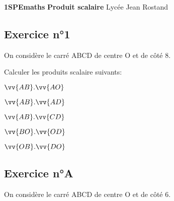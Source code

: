 \documentclass[12pt,a4paper]{article}
\begin{document}
\textbf{1SPEmaths} \hfill \textbf{Produit scalaire} \hfill Lycée Jean Rostand\\
\trait 

\subsection*{Exercice n°1}

On considère le carré ABCD de centre O et de côté 8.

\begin{center}
  
\end{center}
Calculer les produits scalaire suivants:
\begin{enumerate}
\begin{minipage}[t]{0.4\linewidth}
\item $\vv{AB}.\vv{AO}$
\item $\vv{AB}.\vv{AD}$
\end{minipage}
\begin{minipage}[t]{0.4\linewidth}
\item $\vv{AB}.\vv{CD}$
\item $\vv{BO}.\vv{OD}$
\end{minipage}
\begin{minipage}[t]{0.4\linewidth}
\item $\vv{OB}.\vv{DO}$
\end{minipage}

\end{enumerate}

\subsection*{Exercice n°A}


On considère le carré ABCD de centre O et de côté 6.
\end{document}
